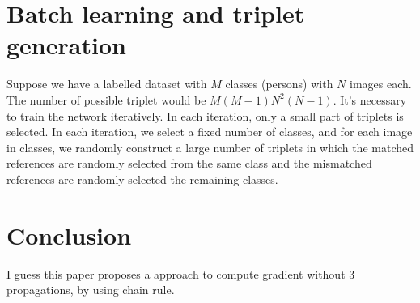 \section{Batch learning and triplet generation}
Suppose we have a labelled dataset with $M$ classes (persons) with $N$ images each. The number of possible
triplet would be $M(M-1)N^2(N-1)$. It's necessary to train the network iteratively. In each iteration,
only a small part of triplets is selected. In each iteration, we select a fixed number of classes, and
for each image in classes, we randomly construct a large number of triplets in which the matched references
are randomly selected from the same class and the mismatched references are randomly selected the remaining
classes.

\section{Conclusion}
I guess this paper proposes a approach to compute gradient without 3 propagations, by using chain rule.

